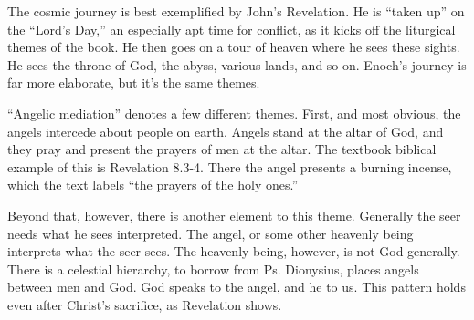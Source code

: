 \documentclass{article}
\begin{document}
The cosmic journey is best exemplified by John's Revelation.
He is ``taken up'' on the ``Lord's Day,'' an especially apt time for conflict, as it kicks off the liturgical themes of the book.
He then goes on a tour of heaven where he sees these sights.
He sees the throne of God, the abyss, various lands, and so on.
Enoch's journey is far more elaborate, but it's the same themes.

``Angelic mediation'' denotes a few different themes.
First, and most obvious, the angels intercede about people on earth.
Angels stand at the altar of God, and they pray and present the prayers of men at the altar.
The textbook biblical example of this is Revelation 8.3-4.
There the angel presents a burning incense, which the text labels ``the prayers of the holy ones.''

Beyond that, however, there is another element to this theme.
Generally the seer needs what he sees interpreted.
The angel, or some other heavenly being interprets what the seer sees.
The heavenly being, however, is not God generally.
There is a celestial hierarchy, to borrow from Ps. Dionysius, places angels between men and God.
God speaks to the angel, and he to us.
This pattern holds even after Christ's sacrifice, as Revelation shows.
\end{document}
